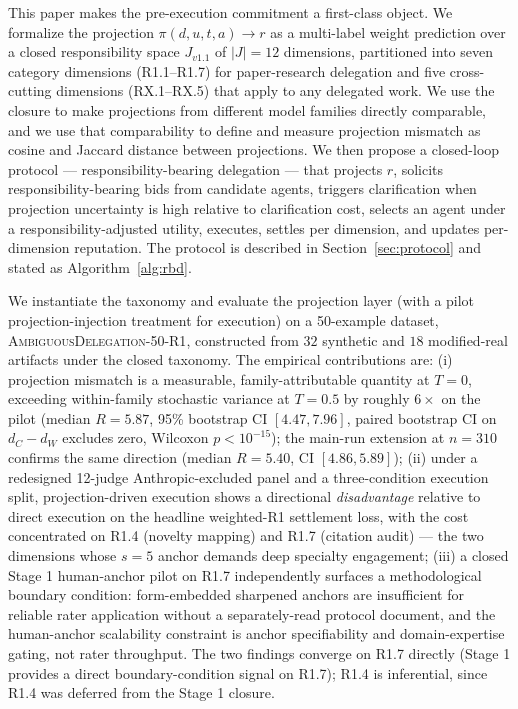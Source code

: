 This paper makes the pre-execution commitment a first-class object. We formalize the projection $\pi(d, u, t, a) \to r$ as a multi-label weight prediction over a closed responsibility space $J_{v1.1}$ of $|J| = 12$ dimensions, partitioned into seven category dimensions (R1.1--R1.7) for paper-research delegation and five cross-cutting dimensions (RX.1--RX.5) that apply to any delegated work. We use the closure to make projections from different model families directly comparable, and we use that comparability to define and measure projection mismatch as cosine and Jaccard distance between projections. We then propose a closed-loop protocol --- responsibility-bearing delegation --- that projects $r$, solicits responsibility-bearing bids from candidate agents, triggers clarification when projection uncertainty is high relative to clarification cost, selects an agent under a responsibility-adjusted utility, executes, settles per dimension, and updates per-dimension reputation. The protocol is described in Section~\ref{sec:protocol} and stated as Algorithm~\ref{alg:rbd}.

We instantiate the taxonomy and evaluate the projection layer (with a pilot projection-injection treatment for execution) on a 50-example dataset, \textsc{AmbiguousDelegation-50-R1}, constructed from $32$ synthetic and $18$ modified-real artifacts under the closed taxonomy. The empirical contributions are: (i) projection mismatch is a measurable, family-attributable quantity at $T = 0$, exceeding within-family stochastic variance at $T = 0.5$ by roughly $6\times$ on the pilot (median $R = 5.87$, 95\% bootstrap CI $[4.47, 7.96]$, paired bootstrap CI on $d_C - d_W$ excludes zero, Wilcoxon $p < 10^{-15}$); the main-run extension at $n = 310$ confirms the same direction (median $R = 5.40$, CI $[4.86, 5.89]$); (ii) under a redesigned 12-judge Anthropic-excluded panel and a three-condition execution split, projection-driven execution shows a directional \emph{disadvantage} relative to direct execution on the headline weighted-R1 settlement loss, with the cost concentrated on R1.4 (novelty mapping) and R1.7 (citation audit) --- the two dimensions whose $s = 5$ anchor demands deep specialty engagement; (iii) a closed Stage 1 human-anchor pilot on R1.7 independently surfaces a methodological boundary condition: form-embedded sharpened anchors are insufficient for reliable rater application without a separately-read protocol document, and the human-anchor scalability constraint is anchor specifiability and domain-expertise gating, not rater throughput. The two findings converge on R1.7 directly (Stage 1 provides a direct boundary-condition signal on R1.7); R1.4 is inferential, since R1.4 was deferred from the Stage 1 closure.

